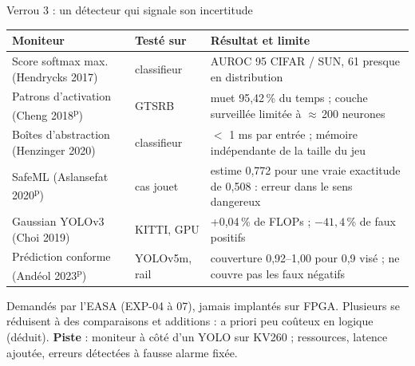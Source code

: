 \documentclass[aspectratio=169,11pt]{beamer}
\newcommand{\pre}{\textsuperscript{\color{acc}p}}
\begin{document}
\begin{frame}{Verrou 3 : un détecteur qui signale son incertitude}
  \scriptsize
  \begin{tabularx}{\textwidth}{@{}p{3.3cm} p{2cm} L@{}}
    \toprule
    Moniteur & Testé sur & Résultat et limite \\
    \midrule
    Score softmax max. (Hendrycks 2017) & classifieur & AUROC 95 CIFAR / SUN, 61 presque
      en distribution \\
    Patrons d'activation (Cheng 2018\pre) & GTSRB & muet 95,42\,\% du temps ; couche
      surveillée limitée à $\approx$\,200 neurones \\
    Boîtes d'abstraction (Henzinger 2020) & classifieur & $<$ 1 ms par entrée ; mémoire
      indépendante de la taille du jeu \\
    SafeML (Aslansefat 2020\pre) & cas jouet & estime 0,772 pour une vraie exactitude de
      0,508 : erreur dans le sens dangereux \\
    Gaussian YOLOv3 (Choi 2019) & KITTI, GPU & +0,04\,\% de FLOPs ; $-41{,}4$\,\% de faux
      positifs \\
    Prédiction conforme (Andéol 2023\pre) & YOLOv5m, rail & couverture 0,92--1,00 pour
      0,9 visé ; \alert{ne couvre pas les faux négatifs} \\
    \bottomrule
  \end{tabularx}

  \vspace{0.5em}
  \small
  Demandés par l'EASA (EXP-04 à 07), \alert{jamais implantés sur FPGA}. Plusieurs se réduisent
  à des comparaisons et additions : a priori peu coûteux en logique {\scriptsize\color{acc}(déduit)}.
  \textbf{Piste} : moniteur à côté d'un YOLO sur KV260 ; ressources, latence ajoutée, erreurs
  détectées à fausse alarme fixée.
\end{frame}
\end{document}
